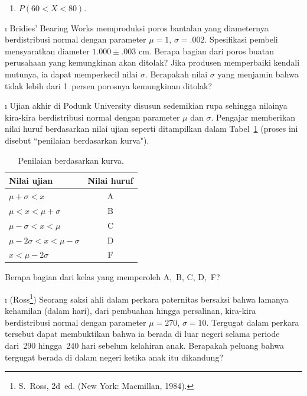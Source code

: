 \begin{LJSItem}
\begin{enumerate}
\item $P(60 < X < 80)$.
\end{enumerate}

\i\label{5.2.25} Bridies' Bearing Works memproduksi poros bantalan yang diameternya
berdistribusi normal dengan parameter $\mu = 1$, $\sigma = .002$.  Spesifikasi pembeli
mensyaratkan diameter $1.000 \pm .003$ cm.  Berapa bagian dari poros buatan perusahaan
yang kemungkinan akan ditolak?  Jika produsen memperbaiki kendali mutunya, ia dapat
memperkecil nilai $\sigma$.  Berapakah nilai $\sigma$ yang menjamin bahwa tidak lebih
dari 1~persen porosnya kemungkinan ditolak?

\i\label{exer 5.2.26} Ujian akhir di Podunk University disusun sedemikian rupa
sehingga nilainya kira-kira berdistribusi normal dengan parameter $\mu$ dan $\sigma$.
Pengajar memberikan nilai huruf berdasarkan nilai ujian seperti ditampilkan dalam
Tabel~\ref{table 5.9} (proses ini disebut ``penilaian berdasarkan kurva").
\begin{table}
\centering
\begin{tabular}{lc} Nilai ujian     & Nilai huruf           \\
\hline
$\mu + \sigma < x$                 & A                      \\
$\mu < x < \mu + \sigma$           & B                      \\
$\mu - \sigma < x < \mu $          & C                      \\
$\mu - 2\sigma < x < \mu - \sigma$ & D                      \\
$x < \mu - 2\sigma$                & F                      \\
\end{tabular}
\caption{Penilaian berdasarkan kurva.}
\label{table 5.9}
\end{table}

\noindent Berapa bagian dari kelas yang memperoleh A,~B, C, D,~F?

\i\label{exer 5.2.27} (Ross\footnote{S.~Ross,  2d~ed. (New York: Macmillan, 1984).}) Seorang saksi ahli dalam perkara
paternitas bersaksi bahwa lamanya kehamilan (dalam hari),
dari pembuahan hingga persalinan, kira-kira berdistribusi normal dengan parameter
$\mu = 270$, $\sigma = 10$.  Tergugat dalam perkara tersebut dapat membuktikan bahwa
ia berada di luar negeri selama periode dari~290 hingga~240 hari sebelum kelahiran
anak.  Berapakah peluang bahwa tergugat berada di dalam negeri ketika anak itu
dikandung?


\end{LJSItem}
